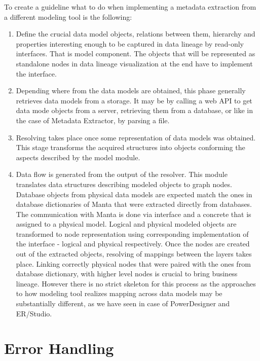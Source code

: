 To create a guideline what to do when implementing a metadata extraction from a different modeling tool is the following:

\begin{enumerate}
	\item Define the crucial data model objects, relations between them, hierarchy and properties interesting enough to be captured in data lineage by read-only interfaces. That is model component. 
	The objects that will be represented as standalone nodes in data lineage visualization at the end have to implement the  interface.
	\item Depending where from the data models are obtained, this phase generally retrieves data models from a storage. It may be by calling a web API to get data mode objects from a server, retrieving them from a database, or like in the case of Metadata Extractor, by parsing a file.
	\item Resolving takes place once some representation of data models was obtained. This stage transforms the acquired structures into objects conforming the aspects described by the model module.
	\item Data flow is generated from the output of the resolver. This module translates data structures describing modeled objects to graph nodes. 
	Database objects from physical data models are expected match the ones in database dictionaries of Manta that were extracted directly from databases. 
	The communication with Manta is done via  interface and a concrete  that is assigned to a physical model.
	Logical and physical modeled objects are transformed to node representation using corresponding implementation of the  interface - logical and physical respectively.
	Once the nodes are created out of the extracted objects, resolving of mappings between the layers takes place.
	Linking correctly physical nodes that were paired with the ones from database dictionary, with higher level nodes is crucial to bring business lineage. 
	However there is no strict skeleton for this process as the approaches to how modeling tool realizes mapping across data models may be substantially different, as we have seen in case of PowerDesigner and ER/Studio.
\end{enumerate} 

\section{Error Handling}

